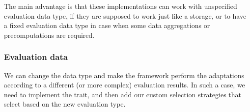 The main advantage is that these implementations can work with unspecified evaluation data type, if they are supposed to work just like a storage, or to have a fixed evaluation data type in case when some data aggregations or precomputations are required.

\subsubsection{Evaluation data}

We can change the  data type and make the framework perform the adaptations according to a different (or more complex) evaluation results. In such a case, we need to implement the  trait, and then add our custom selection strategies that select based on the new evaluation type.